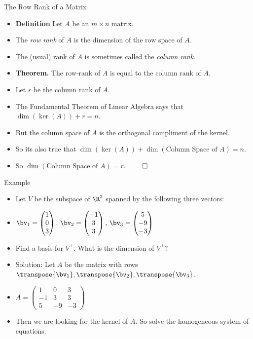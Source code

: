 \documentclass{beamer}
\begin{document}
\begin{frame}{The Row Rank of a Matrix}
\begin{itemize}
\item \textbf{Definition} Let $A$ be an $m\times n$ matrix.
\item The \emph{row rank} of $A$ is the dimension of the row space of $A$.
\item The (usual) rank of $A$ is sometimes called the \emph{column rank}.
\item \textbf{Theorem.} The row-rank of $A$ is equal to the column rank of $A$.
\item Let $r$ be the column rank of $A$.
\item The Fundamental Theorem of Linear Algebra says that $\dim(\ker(A)) + r = n$.
\item But the column space of $A$ is the orthogonal compliment of the kernel.
\item So its also true that $\dim(\ker(A)) + \dim(\text{Column Space of $A$}) = n$.
\item So $\dim(\text{Column Space of $A$}) = r$. $\qed$
\end{itemize}
\end{frame}

\begin{frame}{Example}
\begin{itemize}
\item Let $V$ be the subspace of $\R^3$ spanned by the following three vectors:
\item $\bv_1=
\begin{pmatrix}
1  \\
0  \\
3   \\
\end{pmatrix}
\text{, }
\bv_2=
\begin{pmatrix}
-1 \\
3\\
3 \\
\end{pmatrix}
\text{, }
\bv_3=
\begin{pmatrix}
5 \\
-9 \\
-3 \\
\end{pmatrix}
$
\item Find a basis for $V^{\perp}$. What is the dimension of $V^{\perp}$?
\item Solution: Let $A$ be the matrix with rows $\transpose{\bv_1}, \transpose{\bv_2}, \transpose{\bv_3}$.
\item $A=
\begin{pmatrix}
1 & 0 & 3   \\
-1 & 3 & 3  \\
5 & -9 & -3
\end{pmatrix}
$
\item Then we are looking for the kernel of $A$. So solve the homogeneous system of equations.
\end{itemize}
\end{frame}
\end{document}
